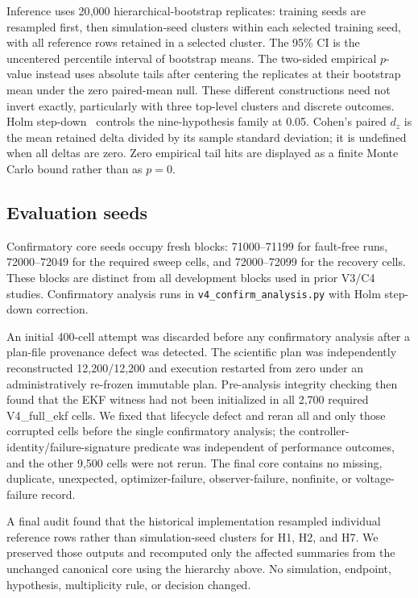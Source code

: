 \documentclass[conference]{IEEEtran}
\begin{document}
Inference uses 20{,}000 hierarchical-bootstrap replicates: training seeds are
resampled first, then simulation-seed clusters within each selected training
seed, with all reference rows retained in a selected cluster. The 95\% CI is
the uncentered percentile interval of bootstrap means. The two-sided empirical
$p$-value instead uses absolute tails after centering the replicates at their
bootstrap mean under the zero paired-mean null. These different constructions
need not invert exactly, particularly with three top-level clusters and
discrete outcomes. Holm step-down~\cite{Holm1979} controls the
nine-hypothesis family at 0.05. Cohen's paired $d_z$ is the mean retained
delta divided by its sample standard deviation; it is undefined when all
deltas are zero. Zero empirical tail hits are displayed as a finite
Monte Carlo bound rather than as $p=0$.

\subsection{Evaluation seeds}
\label{sec:seeds}

Confirmatory core seeds occupy fresh blocks: 71000--71199 for fault-free
runs, 72000--72049 for the required sweep cells, and 72000--72099 for the
recovery cells. These blocks are distinct from all development blocks used in
prior V3/C4 studies. Confirmatory analysis runs in
\texttt{v4\_confirm\_analysis.py} with Holm step-down correction.

An initial 400-cell attempt was discarded before any confirmatory analysis
after a plan-file provenance defect was detected. The scientific plan was
independently reconstructed 12{,}200/12{,}200 and execution restarted from
zero under an administratively re-frozen immutable plan. Pre-analysis
integrity checking then found that the EKF witness had not been initialized
in all 2{,}700 required V4\_full\_ekf cells. We fixed that lifecycle defect
and reran all and only those corrupted cells before the single confirmatory
analysis; the controller-identity/failure-signature predicate was independent
of performance outcomes, and the other 9{,}500 cells were not rerun. The final core contains no
missing, duplicate, unexpected, optimizer-failure, observer-failure,
nonfinite, or voltage-failure record.

A final audit found that the historical implementation resampled individual
reference rows rather than simulation-seed clusters for H1, H2, and H7.
We preserved those outputs and recomputed only the affected summaries from the
unchanged canonical core using the hierarchy above. No simulation, endpoint,
hypothesis, multiplicity rule, or decision changed.
\end{document}
